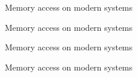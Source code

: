 \documentclass[NET,english,aspectratio=169,notitleframe]{tumbeamer}
\begin{document}
\begin{frame}{Memory access on modern systems}
\centering
\end{frame}

\begin{frame}{Memory access on modern systems}
\centering
\end{frame}

\begin{frame}{Memory access on modern systems}
\centering
\end{frame}

\begin{frame}{Memory access on modern systems}
\centering
\end{frame}
\end{document}
